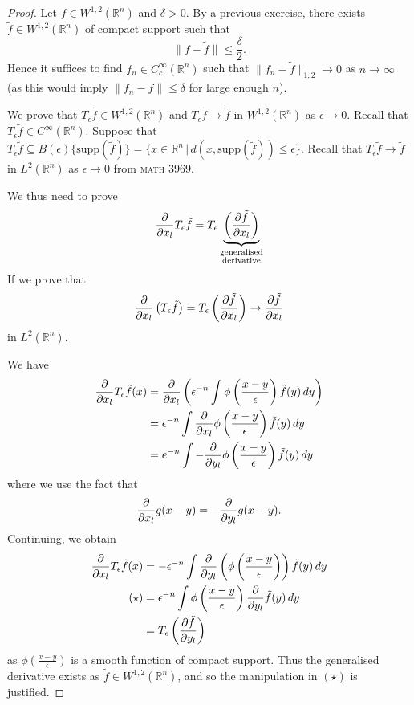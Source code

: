 \documentclass[10pt, oneside, reqno]{amsart}
\theoremstyle{plain}%
\numberwithin{equation}{section}
\theoremstyle{definition}
\theoremstyle{remark}
\newcommand{\given}{ \, | \,}
\newcommand{\R}{\mathbb{R}}
\begin{document}
\begin{proof}
	Let $f \in W^{1, 2}(\R^n)$ and $\delta > 0$.  By a previous exercise, there exists $\tilde f \in W^{1, 2}(\R^n)$ of compact support such that \[
		\| f - \tilde f \| \leq \frac{\delta}{2}.
	\]  Hence it suffices to find $f_n \in C^\infty_c(\R^n)$ such that $\| f_n - \tilde f\|_{1, 2} \rightarrow 0$ as $n \rightarrow \infty$ (as this would imply $\| f_n - f \| \leq \delta$ for large enough $n$).  
	
	We prove that $T_\epsilon \tilde f \in W^{1, 2}(\R^n)$ and $T_\epsilon \tilde f \rightarrow \tilde f$ in $W^{1, 2}(\R^n)$ as $\epsilon \rightarrow 0$.  Recall that $T_\epsilon \tilde f \in C^{\infty}(\R^n)$.  Suppose that $T_\epsilon \tilde f \subseteq B(\epsilon)\{ \text{supp}(\tilde f) \} = \{ x \in \R^n \given d(x, \text{supp}(\tilde f)) \leq \epsilon \}$.  Recall that $T_\epsilon \tilde f \rightarrow \tilde f$ in $L^2(\R^n)$ as $\epsilon \rightarrow 0$ from \textsc{math 3969}.  
	
	We thus need to prove \begin{equation}
		\frac{\partial }{\partial x_l} T_\epsilon \tilde f = T_\epsilon \underbrace{\left( \frac{\partial \tilde f}{\partial x_l} \right)}_{\substack{\text{generalised} \\ \text{derivative}}}
	\end{equation}
  If we prove that \[
		\frac{\partial }{\partial x_l}\left(T_\epsilon \tilde f \right) = T_\epsilon \left(\frac{\partial \tilde f}{\partial x_l} \right) \rightarrow \frac{\partial \tilde f}{\partial x_l}
	\] in $L^2(\R^n)$.  
	
	We have \begin{align*}
		\frac{\partial }{\partial x_l} T_\epsilon \tilde f(x) &= \frac{\partial }{\partial x_l} \left( \epsilon^{-n} \int \phi\left(\frac{x-y}{\epsilon} \right) \tilde f(y) \, dy \right) \\
		&= \epsilon^{-n} \int \frac{\partial }{\partial x_l} \phi\left(\frac{x-y}{\epsilon} \right) \tilde f(y) \, dy \\
		&= e^{-n} \int -\frac{\partial }{\partial y_l} \phi\left( \frac{x-y}{\epsilon} \right) \tilde f(y) \, dy 
	\end{align*} where we use the fact that \[
		\frac{\partial }{\partial x_l}g(x-y) = - \frac{\partial }{\partial y_l} g(x-y).
	\]  Continuing, we obtain \begin{align*}
		\frac{\partial }{\partial x_l} T_\epsilon \tilde f(x)	&= -\epsilon^{-n} \int \frac{\partial }{\partial y_l} \left( \phi\left(\frac{x-y}{\epsilon} \right) \right) \tilde f(y) \, dy \\
		\tag{$\star$}
		 &= \epsilon^{-n} \int \phi \left(\frac{x-y}{\epsilon} \right) \frac{\partial }{\partial y_l} \tilde f(y) \, dy \\
		&= T_\epsilon \left( \frac{\partial \tilde f}{\partial  y_l}\right)
	\end{align*} as $\phi\left(\frac{x-y}{\epsilon} \right)$ is a smooth function of compact support.  Thus the generalised derivative exists as $\tilde f \in W^{1, 2}(\R^n)$, and so the manipulation in $(\star)$ is justified.
	
\end{proof}
\end{document}
